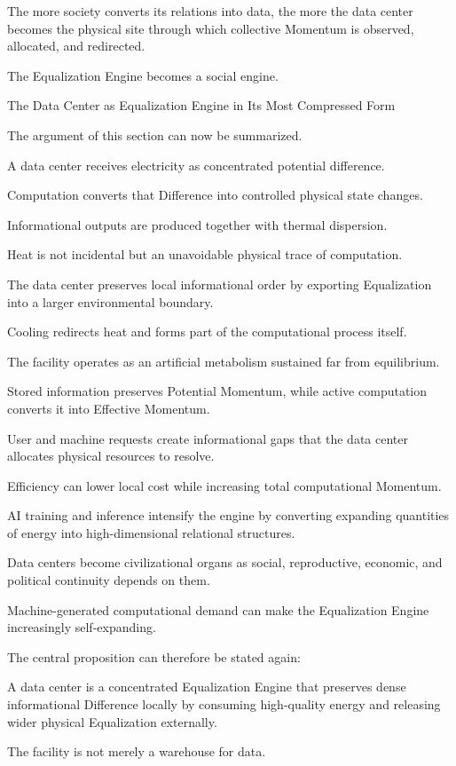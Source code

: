 The more society converts its relations into data, the more the data center becomes the physical site through which collective Momentum is observed, allocated, and redirected.

The Equalization Engine becomes a social engine.

The Data Center as Equalization Engine in Its Most Compressed Form

The argument of this section can now be summarized.

A data center receives electricity as concentrated potential difference.

Computation converts that Difference into controlled physical state changes.

Informational outputs are produced together with thermal dispersion.

Heat is not incidental but an unavoidable physical trace of computation.

The data center preserves local informational order by exporting Equalization into a larger environmental boundary.

Cooling redirects heat and forms part of the computational process itself.

The facility operates as an artificial metabolism sustained far from equilibrium.

Stored information preserves Potential Momentum, while active computation converts it into Effective Momentum.

User and machine requests create informational gaps that the data center allocates physical resources to resolve.

Efficiency can lower local cost while increasing total computational Momentum.

AI training and inference intensify the engine by converting expanding quantities of energy into high-dimensional relational structures.

Data centers become civilizational organs as social, reproductive, economic, and political continuity depends on them.

Machine-generated computational demand can make the Equalization Engine increasingly self-expanding.

The central proposition can therefore be stated again:

A data center is a concentrated Equalization Engine that preserves dense informational Difference locally by consuming high-quality energy and releasing wider physical Equalization externally.

The facility is not merely a warehouse for data.

